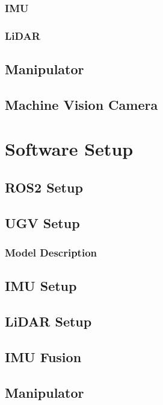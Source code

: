\subsubsection{IMU}

\subsubsection{LiDAR}

\subsection{Manipulator}

\subsection{Machine Vision Camera}

\section{Software Setup}

\subsection{ROS2 Setup}

\subsection{UGV Setup}
\subsubsection{Model Description}

\subsection{IMU Setup}

\subsection{LiDAR Setup}

\subsection{IMU Fusion}

\subsection{Manipulator}
